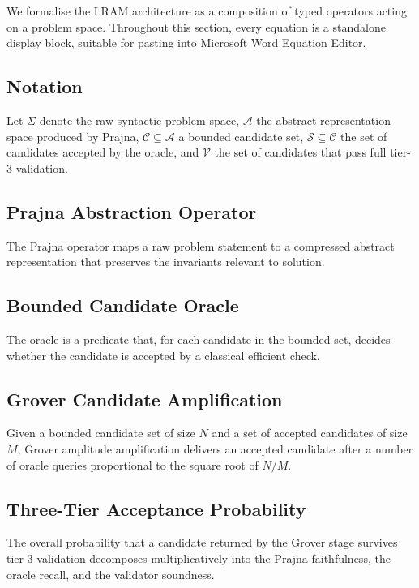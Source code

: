 We formalise the LRAM architecture as a composition of typed operators acting on a problem space. Throughout this section, every equation is a standalone display block, suitable for pasting into Microsoft Word Equation Editor.

\subsection{Notation}
Let $\Sigma$ denote the raw syntactic problem space, $\mathcal{A}$ the abstract representation space produced by Prajna, $\mathcal{C} \subseteq \mathcal{A}$ a bounded candidate set, $\mathcal{S} \subseteq \mathcal{C}$ the set of candidates accepted by the oracle, and $\mathcal{V}$ the set of candidates that pass full tier-3 validation.

\subsection{Prajna Abstraction Operator}
The Prajna operator maps a raw problem statement to a compressed abstract representation that preserves the invariants relevant to solution.


\subsection{Bounded Candidate Oracle}
The oracle is a predicate that, for each candidate in the bounded set, decides whether the candidate is accepted by a classical efficient check.


\subsection{Grover Candidate Amplification}
Given a bounded candidate set of size $N$ and a set of accepted candidates of size $M$, Grover amplitude amplification delivers an accepted candidate after a number of oracle queries proportional to the square root of $N/M$.


\subsection{Three-Tier Acceptance Probability}
The overall probability that a candidate returned by the Grover stage survives tier-3 validation decomposes multiplicatively into the Prajna faithfulness, the oracle recall, and the validator soundness.


